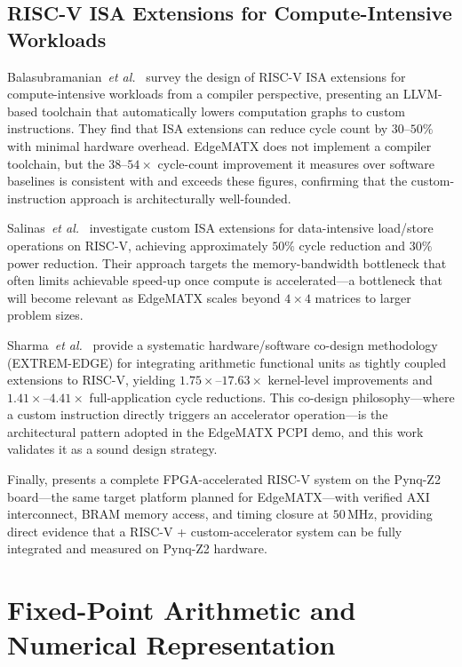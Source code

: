 ﻿\documentclass[12pt,a4paper]{report}
\begin{document}
\subsection{RISC-V ISA Extensions for Compute-Intensive Workloads}

Balasubramanian~\textit{et al.}~\cite{balasubramanian2024riscv}
survey the design of RISC-V ISA extensions for compute-intensive
workloads from a compiler perspective, presenting an LLVM-based
toolchain that automatically lowers computation graphs to custom
instructions.
They find that ISA extensions can reduce cycle count by
$30$--$50\%$ with minimal hardware overhead.
EdgeMATX does not implement a compiler toolchain, but the
$38$--$54\times$ cycle-count improvement it measures over
software baselines is consistent with and exceeds these figures,
confirming that the custom-instruction approach is architecturally
well-founded.

Salinas~\textit{et al.}~\cite{salinas2024custom} investigate
custom ISA extensions for data-intensive load/store operations
on RISC-V, achieving approximately $50\%$ cycle reduction and
$30\%$ power reduction.
Their approach targets the memory-bandwidth bottleneck that often
limits achievable speed-up once compute is accelerated---a
bottleneck that will become relevant as EdgeMATX scales beyond
$4\times4$ matrices to larger problem sizes.

Sharma~\textit{et al.}~\cite{sharma2022extremedge} provide a
systematic hardware/software co-design methodology
(EXTREM-EDGE) for integrating arithmetic functional units as
tightly coupled extensions to RISC-V, yielding
$1.75\times$--$17.63\times$ kernel-level improvements and
$1.41\times$--$4.41\times$ full-application cycle reductions.
This co-design philosophy---where a custom instruction directly
triggers an accelerator operation---is the architectural pattern
adopted in the EdgeMATX PCPI demo, and this work validates it as a
sound design strategy.


Finally, \cite{anon2025fpgariesv} presents a complete
FPGA-accelerated RISC-V system on the Pynq-Z2 board---the same
target platform planned for EdgeMATX---with verified AXI
interconnect, BRAM memory access, and timing closure at
$50\,$MHz, providing direct evidence that a RISC-V +
custom-accelerator system can be fully integrated and measured on
Pynq-Z2 hardware.

\section{Fixed-Point Arithmetic and Numerical Representation}
\end{document}
